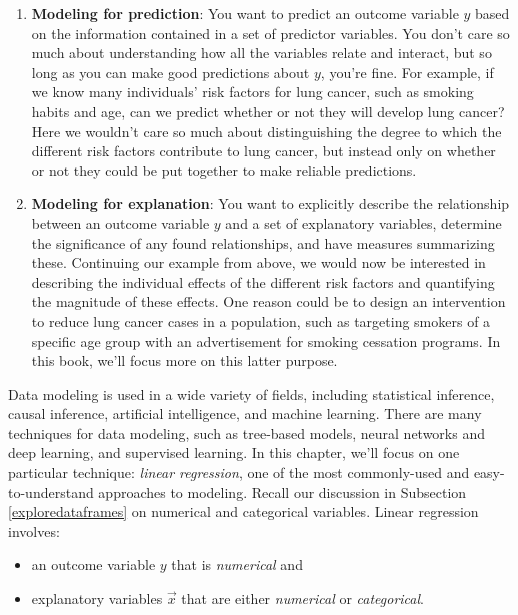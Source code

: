 \documentclass[12pt,]{krantz}
\providecommand{\tightlist}{%
  \setlength{\itemsep}{0pt}\setlength{\parskip}{0pt}}
\theoremstyle{definition}
\theoremstyle{definition}
\theoremstyle{definition}
\theoremstyle{remark}
\begin{document}
\begin{enumerate}
\def\labelenumi{\arabic{enumi}.}
\tightlist
\item
  \textbf{Modeling for prediction}: You want to predict an outcome
  variable \(y\) based on the information contained in a set of
  predictor variables. You don't care so much about understanding how
  all the variables relate and interact, but so long as you can make
  good predictions about \(y\), you're fine. For example, if we know
  many individuals' risk factors for lung cancer, such as smoking habits
  and age, can we predict whether or not they will develop lung cancer?
  Here we wouldn't care so much about distinguishing the degree to which
  the different risk factors contribute to lung cancer, but instead only
  on whether or not they could be put together to make reliable
  predictions.
\item
  \textbf{Modeling for explanation}: You want to explicitly describe the
  relationship between an outcome variable \(y\) and a set of
  explanatory variables, determine the significance of any found
  relationships, and have measures summarizing these. Continuing our
  example from above, we would now be interested in describing the
  individual effects of the different risk factors and quantifying the
  magnitude of these effects. One reason could be to design an
  intervention to reduce lung cancer cases in a population, such as
  targeting smokers of a specific age group with an advertisement for
  smoking cessation programs. In this book, we'll focus more on this
  latter purpose.
\end{enumerate}

Data modeling is used in a wide variety of fields, including statistical
inference, causal inference, artificial intelligence, and machine
learning. There are many techniques for data modeling, such as
tree-based models, neural networks and deep learning, and supervised
learning. In this chapter, we'll focus on one particular technique:
\emph{linear regression}, one of the most commonly-used and
easy-to-understand approaches to modeling. Recall our discussion in
Subsection \ref{exploredataframes} on numerical and categorical
variables. Linear regression involves:

\begin{itemize}
\tightlist
\item
  an outcome variable \(y\) that is \emph{numerical} and
\item
  explanatory variables \(\vec{x}\) that are either \emph{numerical} or
  \emph{categorical}.
\end{itemize}
\end{document}

